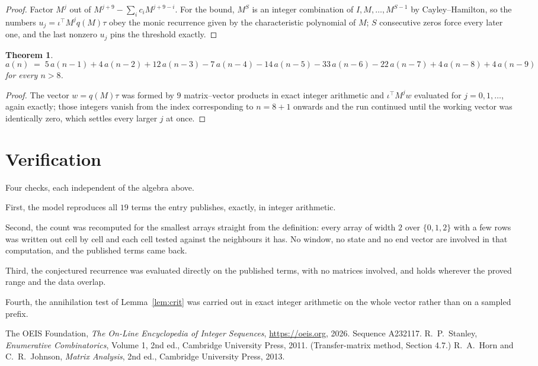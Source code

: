 \documentclass[11pt,a4paper]{article}
\theoremstyle{plain}
\newtheorem{theorem}{Theorem}
\theoremstyle{definition}
\begin{document}
\begin{proof}
Factor $M^{j}$ out of $M^{j+9}-\sum_ic_iM^{j+9-i}$. For the bound, $M^{S}$
is an integer combination of $I,M,\dots,M^{S-1}$ by Cayley--Hamilton, so the numbers
$u_j=\iota^{\!\top}M^{j}q(M)\tau$ obey the monic recurrence given by the characteristic
polynomial of $M$; $S$ consecutive zeros force every later one, and the last nonzero $u_j$
pins the threshold exactly.
\end{proof}

\begin{theorem}
\[
a(n)\;=\;5\,a(n-1) + 4\,a(n-2) + 12\,a(n-3) - 7\,a(n-4) - 14\,a(n-5) - 33\,a(n-6) - 22\,a(n-7) + 4\,a(n-8) + 4\,a(n-9)
\]
for every $n>8$.
\end{theorem}

\begin{proof}
The vector $w=q(M)\tau$ was formed by $9$ matrix--vector products in exact integer
arithmetic and $\iota^{\!\top}M^{j}w$ evaluated for $j=0,1,\dots$, again exactly; those
integers vanish from the index corresponding to $n=8+1$ onwards and the run continued
until the working vector was identically zero, which settles every larger $j$ at once.
\end{proof}

\section{Verification}

Four checks, each independent of the algebra above.

First, the model reproduces all $19$ terms the entry publishes, exactly, in integer
arithmetic.

Second, the count was recomputed for the smallest arrays straight from the definition: every
array of width $2$ over $\{0,1,2\}$ with a few rows was written out cell by cell and each cell
tested against the neighbours it has. No window, no state and no end vector are involved in that
computation, and the published terms came back.

Third, the conjectured recurrence was evaluated directly on the published terms, with no
matrices involved, and holds wherever the proved range and the data overlap.

Fourth, the annihilation test of Lemma~\ref{lem:crit} was carried out in exact integer
arithmetic on the whole vector rather than on a sampled prefix.

\begin{thebibliography}{9}
 The OEIS Foundation, \emph{The On-Line Encyclopedia of Integer
Sequences}, \url{https://oeis.org}, 2026. Sequence A232117.
 R.~P.~Stanley, \emph{Enumerative Combinatorics}, Volume 1, 2nd ed.,
Cambridge University Press, 2011. (Transfer-matrix method, Section 4.7.)
 R.~A.~Horn and C.~R.~Johnson, \emph{Matrix Analysis}, 2nd ed., Cambridge
University Press, 2013.
\end{thebibliography}
\end{document}
